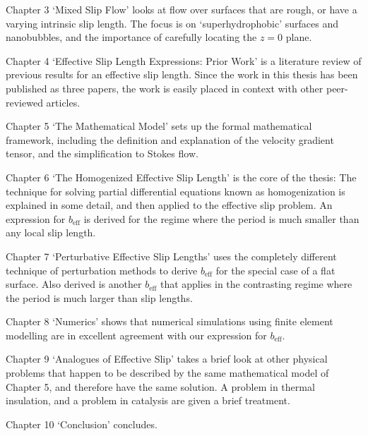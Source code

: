\documentclass[a4paper]{report}
\newcommand{\beff}{\ensuremath{b_{\mathrm{eff}}}}
\begin{document}
Chapter 3 `Mixed Slip Flow' looks at flow over surfaces that are rough, or have a varying intrinsic slip length.  The focus is on `superhydrophobic' surfaces and nanobubbles, and the importance of carefully locating the $z=0$ plane.

Chapter 4 `Effective Slip Length Expressions: Prior Work' is a literature review of previous results for an effective slip length.  Since the work in this thesis has been published as three papers, the work is easily placed in context with other peer-reviewed articles.

Chapter 5 `The Mathematical Model' sets up the formal mathematical framework, including the definition and explanation of the velocity gradient tensor, and the simplification to Stokes flow.

Chapter 6 `The Homogenized Effective Slip Length' is the core of the thesis: The technique for solving partial differential equations known as homogenization is explained in some detail, and then applied to the effective slip problem.  An expression for $\beff$ is derived for the regime where the period is much smaller than any local slip length.

Chapter 7 `Perturbative Effective Slip Lengths' uses the completely different technique of perturbation methods to derive $\beff$ for the special case of a flat surface.  Also derived is another $\beff$ that applies in the contrasting regime where the period is much larger than slip lengths.

Chapter 8 `Numerics' shows that numerical simulations using finite element modelling are in excellent agreement with our expression for $\beff$.

Chapter 9 `Analogues of Effective Slip' takes a brief look at other physical problems that happen to be described by the same mathematical model of Chapter 5, and therefore have the same solution.  A problem in thermal insulation, and a problem in catalysis are given a brief treatment.

Chapter 10 `Conclusion' concludes.



\end{document}
